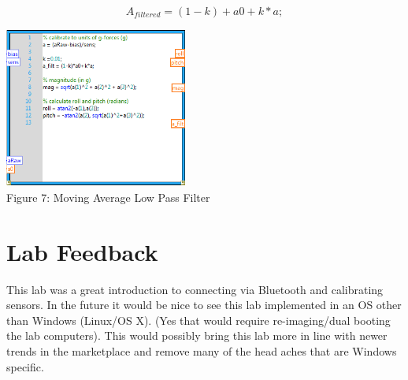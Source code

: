 \documentclass[twoside]{article}
\begin{document}
\begin{multicols}{2}
\begin{equation} A_{filtered} = (1 - k)+a0 + k * a;
\end{equation}

\begin{center}
\includegraphics*[width = 6cm]{FIG7.png}\\
Figure 7: Moving Average Low Pass Filter
\end{center}


\section{Lab Feedback}

This lab was a great introduction to connecting via Bluetooth and calibrating sensors. In the future it would be nice to see this lab implemented in an OS other than Windows (Linux/OS X). (Yes that would require re-imaging/dual booting the lab computers). This would possibly bring this lab more in line with newer trends in the marketplace and remove many of the head aches that are Windows specific. 

\end{multicols}
\end{document}

